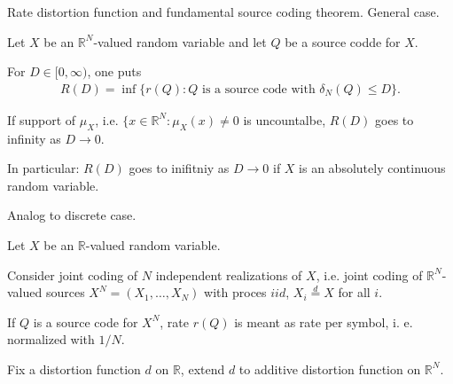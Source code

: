 \begin{frame}{Rate distortion function and fundamental source coding theorem. General case.}  
\bit
\item Let $X$ be an $\mathbb{R}^N$-valued random variable and let $Q$ be a source codde for $X$. 
\item For $D\in [0,\infty)$, one puts
\begin{align*}
R(D)= \inf\{r(Q)\colon \text{$Q$ is a source code with $\delta_N(Q)\leq D$}\}.
\end{align*}
\item If support of $\mu_X$, i.e. $\{x\in\mathbb{R}^N\colon \mu_X(x)\neq 0$ is uncountalbe, $R(D)$ goes to infinity as $D\to 0$. 
\item In particular: $R(D)$ goes to inifitniy as $D\to 0$ if $X$ is an absolutely continuous random variable.
\eit

 Analog to discrete case. 
\bit
\item Let $X$ be an $\mathbb{R}$-valued random variable. 
\item Consider joint coding of $N$ independent realizations of $X$, i.e. 
joint coding of $\mathbb{R}^N$-valued sources $X^N=(X_1,\dots,X_N)$ with 
proces $iid$, $X_i\stackrel{d}{=}X$ for all $i$. 
\item If $Q$ is a source code for $X^N$, rate $r(Q)$ is meant as rate per symbol, i. e. normalized with $1/N$.
\item Fix a distortion function $d$ on $\mathbb{R}$, extend $d$ to additive distortion function on $\mathbb{R}^N$.  
\eit 
\end{frame}

